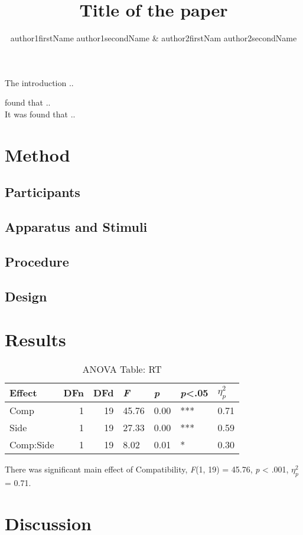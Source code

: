 \documentclass[man, 12pt]{apa6}\usepackage[]{graphicx}\usepackage[]{color}
\title{Title of the paper}
\author{author1firstName author1secondName \& author2firstNam
author2secondName}
\affiliation{Department of Psychology, University of XXX}
\begin{document}
\maketitle
The introduction .. \textcite{botvinick2001conflict}

\textcite{botvinick2001conflict} found that .. \\
It was found that .. \parencite[][]{simon1969reactions, eriksen1974effects, stroop1935studies}

\section{Method}
\subsection{Participants}
\subsection{Apparatus and Stimuli}
\subsection{Procedure}

\subsection{Design}

\section{Results}



\begin{longtable}{lrrllll}
\caption{ANOVA Table: RT} \\ 
  \hline
Effect & DFn & DFd & \textit{F} & \textit{p} & \textit{p}<.05 & $\eta_{p}^2$ \\ 
  \hline
Comp &    1 &   19 & 45.76 & 0.00 & *** & 0.71 \\ 
  Side &    1 &   19 & 27.33 & 0.00 & *** & 0.59 \\ 
  Comp:Side &    1 &   19 &  8.02 & 0.01 & * & 0.30 \\ 
   \hline
\hline
\end{longtable}


There was significant main effect of Compatibility, \emph{F}(1, 19) = 45.76, \emph{p} < .001, $\eta_{p}^2$ = 0.71.

\section{Discussion}

\printbibliography
\end{document}
